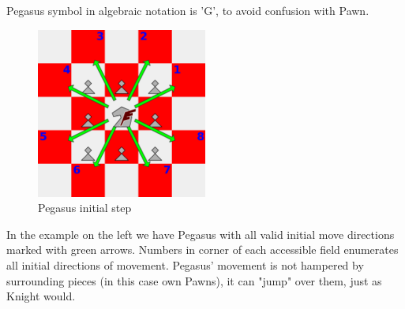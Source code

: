 \documentclass[a5paper,12pt,draft]{book} %
\begin{document}
Pegasus symbol in algebraic notation is 'G', to avoid confusion with Pawn.

\vspace{1\baselineskip}

\noindent
\begin{figure}
\includegraphics[width=0.5\textwidth, keepaspectratio=true]{../gfx/examples/01_move_pegasus_initial.png}
\caption{Pegasus initial step}
\label{fig:pegasus_initial_step}
\end{figure}
\indent
In the example on the left we have Pegasus with all valid initial move directions
marked with green arrows. Numbers in corner of each accessible field enumerates
all initial directions of movement. Pegasus' movement is not hampered by surrounding
pieces (in this case own Pawns), it can "jump" over them, just as Knight would.

\clearpage
\end{document}
